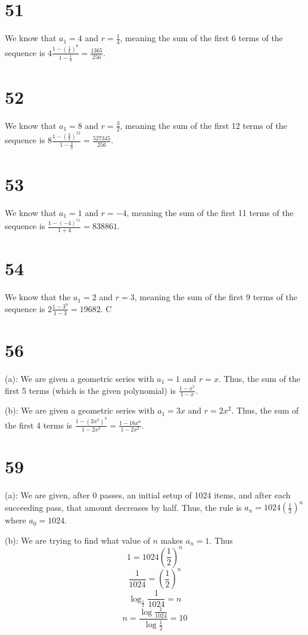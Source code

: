 \documentclass{article}
\theoremstyle{definition}
\newcommand{\?}{\stackrel{?}{=}}
\begin{document}
\section*{51}
We know that $a_1=4$ and $r=\frac{1}{4}$, meaning the sum of the first 6 terms of the sequence is $4\frac{1-(\frac{1}{4})^6}{1-\frac{1}{4}}=\frac{1365}{256}$.

\section*{52}
We know that $a_1=8$ and $r=\frac{3}{2}$, meaning the sum of the first 12 terms of the sequence is $8\frac{1-(\frac{3}{2})^{12}}{1-\frac{3}{2}}=\frac{527345}{256}$.

\section*{53}
We know that $a_1=1$ and $r=-4$, meaning the sum of the first 11 terms of the sequence is $\frac{1-(-4)^{11}}{1+4}=838861$.

\section*{54}
We know that the $a_1=2$ and $r=3$, meaning the sum of the first $9$ terms of the sequence is $2\frac{1-3^9}{1-3}=19682$. C

\section*{56}
(a): We are given a geometric series with $a_1=1$ and $r=x$. Thus, the sum of the first 5 terms (which is the given polynomial) is 
$\frac{1-x^5}{1-x}$.


(b): We are given a geometric series with $a_1=3x$ and $r=2x^2$. Thus, the sum of the first 4 terms is
$\frac{1-(2x^2)^4}{1-2x^2}=\frac{1-16x^8}{1-2x^2}$.

\section*{59}
(a): We are given, after $0$ passes, an initial setup of 1024 items, and after each succeeding pass, that amount decreases by half. Thus, 
the rule is $a_n=1024(\frac{1}{2})^n$ where $a_0=1024$.


(b): We are trying to find what value of $n$ makes $a_n=1$. Thus \[ 1=1024(\frac{1}{2})^n \] \[ \frac{1}{1024}=(\frac{1}{2})^n \]
\[ \log_{\frac{1}{2}}\frac{1}{1024}=n \] \[ n=\frac{\log\frac{1}{1024}}{\log\frac{1}{2}}=10 \]
\end{document}

